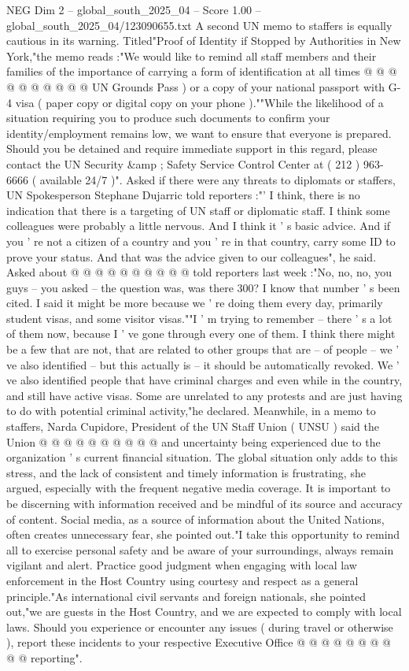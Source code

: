 \begin{textsample}{NEG Dim 2 – global\_south\_2025\_04 – Score 1.00 – global\_south\_2025\_04/123090655.txt}
A second UN memo to staffers is equally cautious in its warning.
Titled"Proof of Identity if Stopped by Authorities in New York,"the memo reads :"We would like to remind all staff members and their families of the importance of carrying a form of identification at all times @ @ @ @ @ @ @ @ @ @ UN Grounds Pass ) or a copy of your national passport with G-4 visa ( paper copy or digital copy on your phone ).""While the likelihood of a situation requiring you to produce such documents to confirm your identity/employment remains low, we want to ensure that everyone is prepared.
Should you be detained and require immediate support in this regard, please contact the UN Security \&amp ; Safety Service Control Center at ( 212 ) 963-6666 ( available 24/7 )".
Asked if there were any threats to diplomats or staffers, UN Spokesperson Stephane Dujarric told reporters :"' I think, there is no indication that there is a targeting of UN staff or diplomatic staff.
I think some colleagues were probably a little nervous.
And I think it ' s basic advice.
And if you ' re not a citizen of a country and you ' re in that country, carry some ID to prove your status.
And that was the advice given to our colleagues", he said.
Asked about @ @ @ @ @ @ @ @ @ @ told reporters last week :"No, no, no, you guys -- you asked -- the question was, was there 300?
I know that number ' s been cited.
I said it might be more because we ' re doing them every day, primarily student visas, and some visitor visas.""I ' m trying to remember -- there ' s a lot of them now, because I ' ve gone through every one of them.
I think there might be a few that are not, that are related to other groups that are -- of people -- we ' ve also identified -- but this actually is -- it should be automatically revoked.
We ' ve also identified people that have criminal charges and even while in the country, and still have active visas.
Some are unrelated to any protests and are just having to do with potential criminal activity,"he declared.
Meanwhile, in a memo to staffers, Narda Cupidore, President of the UN Staff Union ( UNSU ) said the Union @ @ @ @ @ @ @ @ @ @ and uncertainty being experienced due to the organization ' s current financial situation.
The global situation only adds to this stress, and the lack of consistent and timely information is frustrating, she argued, especially with the frequent negative media coverage.
It is important to be discerning with information received and be mindful of its source and accuracy of content.
Social media, as a source of information about the United Nations, often creates unnecessary fear, she pointed out."I take this opportunity to remind all to exercise personal safety and be aware of your surroundings, always remain vigilant and alert.
Practice good judgment when engaging with local law enforcement in the Host Country using courtesy and respect as a general principle."As international civil servants and foreign nationals, she pointed out,"we are guests in the Host Country, and we are expected to comply with local laws.
Should you experience or encounter any issues ( during travel or otherwise ), report these incidents to your respective Executive Office @ @ @ @ @ @ @ @ @ @ reporting".


\end{textsample}
